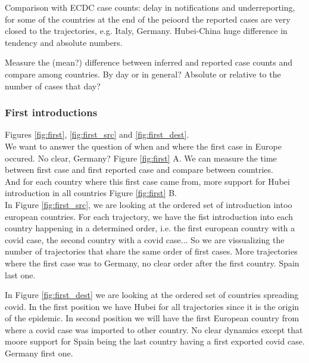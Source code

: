 \documentclass[12pt,]{article}
\begin{document}
Comparison with ECDC case counts: delay in notifications and underreporting, for some of the  countries at the end of the peioord the reported cases are very closed to the trajectories, e.g. Italy, Germany. Hubei-China huge difference in tendency and absolute numbers.\\ 

Measure the (mean?) difference between inferred and reported case counts and compare among countries. By day or in general? Absolute or relative to the number of cases that day?

\subsubsection*{First introductions}
Figures \ref{fig:first}, \ref{fig:first_src} and \ref{fig:first_dest}.\\

We want to answer the question of when and where the first case in Europe occured. No clear, Germany? Figure \ref{fig:first} A. We can measure the time between first case and first reported case and compare between countries. \\
And for each country where this first case came from, more support for Hubei introduction in all countries Figure \ref{fig:first} B.\\

In Figure \ref{fig:first_src}, we are looking at the ordered set of introduction intoo european countries. For each trajectory, we have the fist introduction into each country happening in a determined order, i.e. the first european country with a covid case, the second country with a covid case... So we are vissualizing the number of trajectories that share the same order of first cases. More trajectories where the first case was to Germany, no clear order after the first country. Spain last one.\\

In Figure \ref{fig:first_dest} we are looking at the ordered set of countries spreading covid. In the first position we have Hubei for all trajectories since it is the origin of the epidemic. In second position we will have the first European country from where a covid case was imported to other country. No clear dynamics except that moore support for Spain being the last country having a first exported covid case. Germany first one.\\  
\end{document}
